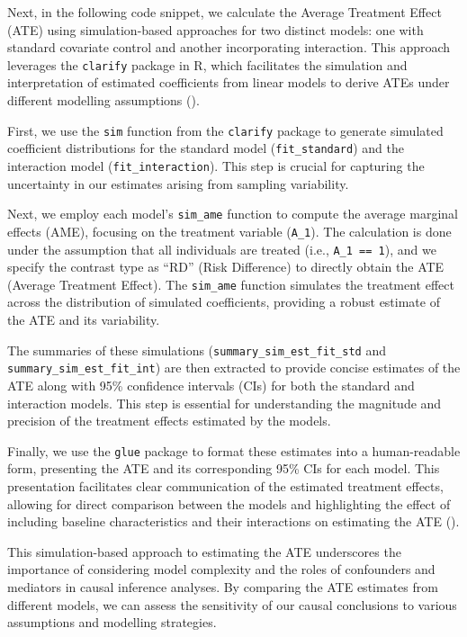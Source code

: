 \documentclass[
  singlecolumn]{article}
\begin{document}
Next, in the following code snippet, we calculate the Average Treatment
Effect (ATE) using simulation-based approaches for two distinct models:
one with standard covariate control and another incorporating
interaction. This approach leverages the \texttt{clarify} package in R,
which facilitates the simulation and interpretation of estimated
coefficients from linear models to derive ATEs under different modelling
assumptions ().

First, we use the \texttt{sim} function from the \texttt{clarify}
package to generate simulated coefficient distributions for the standard
model (\texttt{fit\_standard}) and the interaction model
(\texttt{fit\_interaction}). This step is crucial for capturing the
uncertainty in our estimates arising from sampling variability.

Next, we employ each model's \texttt{sim\_ame} function to compute the
average marginal effects (AME), focusing on the treatment variable
(\texttt{A\_1}). The calculation is done under the assumption that all
individuals are treated (i.e., \texttt{A\_1\ ==\ 1}), and we specify the
contrast type as ``RD'' (Risk Difference) to directly obtain the ATE
(Average Treatment Effect). The \texttt{sim\_ame} function simulates the
treatment effect across the distribution of simulated coefficients,
providing a robust estimate of the ATE and its variability.

The summaries of these simulations (\texttt{summary\_sim\_est\_fit\_std}
and \texttt{summary\_sim\_est\_fit\_int}) are then extracted to provide
concise estimates of the ATE along with 95\% confidence intervals (CIs)
for both the standard and interaction models. This step is essential for
understanding the magnitude and precision of the treatment effects
estimated by the models.

Finally, we use the \texttt{glue} package to format these estimates into
a human-readable form, presenting the ATE and its corresponding 95\% CIs
for each model. This presentation facilitates clear communication of the
estimated treatment effects, allowing for direct comparison between the
models and highlighting the effect of including baseline characteristics
and their interactions on estimating the ATE
().

This simulation-based approach to estimating the ATE underscores the
importance of considering model complexity and the roles of confounders
and mediators in causal inference analyses. By comparing the ATE
estimates from different models, we can assess the sensitivity of our
causal conclusions to various assumptions and modelling strategies.
\end{document}

